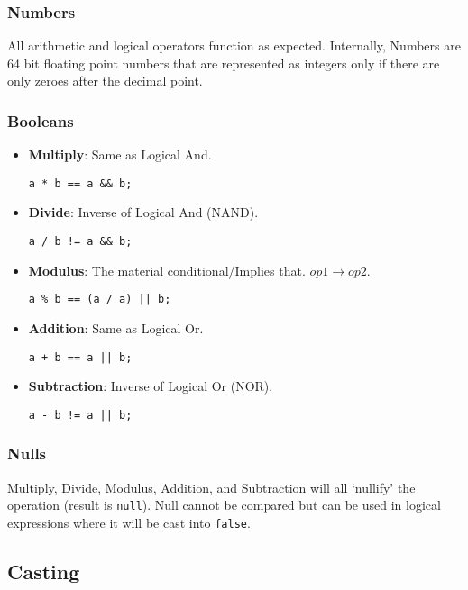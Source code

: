 \subsubsection{Numbers}

All arithmetic and logical operators function as expected. Internally, Numbers are 64 bit floating point numbers that are represented as integers only if there are only zeroes after the decimal point.

\subsubsection{Booleans}

\begin{itemize}
    \item \textbf{Multiply}: Same as Logical And.
    \begin{verbatim}
a * b == a && b;
    \end{verbatim}
    \item \textbf{Divide}: Inverse of Logical And (NAND).
    \begin{verbatim}
a / b != a && b;
    \end{verbatim}
    \item \textbf{Modulus}: The material conditional/Implies that. $op1 \rightarrow op2$.
    \begin{verbatim}
a % b == (a / a) || b;
    \end{verbatim}
    \item \textbf{Addition}: Same as Logical Or.
    \begin{verbatim}
a + b == a || b;
    \end{verbatim}
    \item \textbf{Subtraction}: Inverse of Logical Or (NOR).
    \begin{verbatim}
a - b != a || b;
    \end{verbatim}
\end{itemize}

\subsubsection{Nulls}

Multiply, Divide, Modulus, Addition, and Subtraction will all `nullify' the operation (result is \verb|null|). Null cannot be compared but can be used in logical expressions where it will be cast into \verb|false|.

\subsection{Casting}
\label{sec:hello-sttp-casting}

